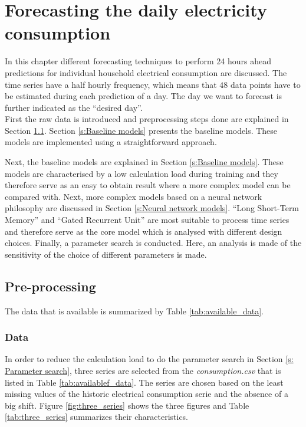\chapter{Forecasting the daily electricity consumption}
\label{cha:Forecasting the daily electricity consumption}
In this chapter different forecasting techniques to perform 24 hours ahead predictions for individual household electrical consumption are discussed. The time series have a half hourly frequency, which means that $ 48 $ data points have to be estimated during each prediction of a day. The day we want to forecast is further indicated as the ``desired day''. \\
First the raw data is introduced and preprocessing steps done are explained in Section \ref{s:Preprocessing}. Section \ref{s:Baseline models} presents the baseline models. These models are implemented using a straightforward approach.


Next, the baseline models are explained in Section \ref{s:Baseline models}. These models are characterised by a low calculation load during training and they therefore serve as an easy to obtain result where a more complex model can be compared with. Next, more complex models based on a neural network philosophy are discussed in Section \ref{s:Neural network models}. ``Long Short-Term Memory'' and ``Gated Recurrent Unit'' are most suitable to process time series and therefore serve as the core model which is analysed with different design choices. Finally, a parameter search is conducted. Here, an analysis is made of the sensitivity of the choice of different parameters is made.\\
 
\section{Pre-processing}\label{s:Preprocessing}
The data that is available is summarized by Table \ref{tab:available_data}. 

\subsection{Data}\label{s:Data}
In order to reduce the calculation load to do the parameter search in Section \ref{s: Parameter search}, three series are selected from the \textit{consumption.csv} that is listed in Table \ref{tab:availablef_data}. The series are chosen based on the least missing values of the historic electrical consumption serie and the absence of a big shift. Figure \ref{fig:three_series} shows the three figures and Table \ref{tab:three_series} summarizes their characteristics.\\

